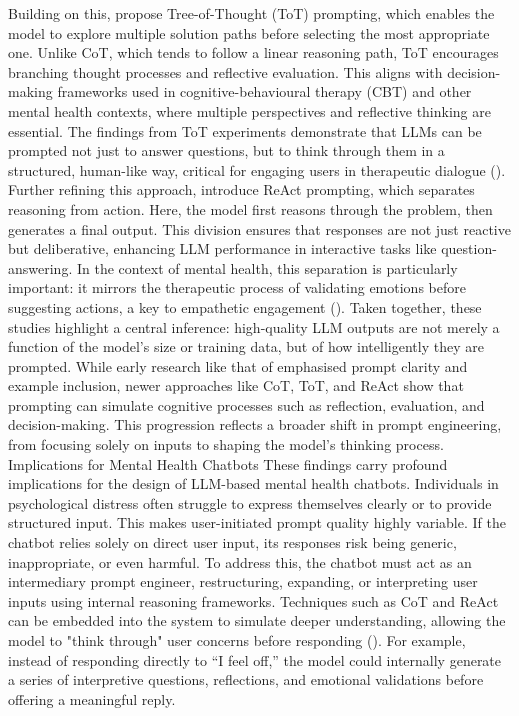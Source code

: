 Building on this, \cite{yao2023tree} propose Tree-of-Thought (ToT) prompting, which enables the model to explore multiple solution paths before selecting the most appropriate one. Unlike CoT, which tends to follow a linear reasoning path, ToT encourages branching thought processes and reflective evaluation. This aligns with decision-making frameworks used in cognitive-behavioural therapy (CBT) and other mental health contexts, where multiple perspectives and reflective thinking are essential. The findings from ToT experiments demonstrate that LLMs can be prompted not just to answer questions, but to think through them in a structured, human-like way, critical for engaging users in therapeutic dialogue (\cite{yao2023tree}).
Further refining this approach, \cite{yao2022react} introduce ReAct prompting, which separates reasoning from action. Here, the model first reasons through the problem, then generates a final output. This division ensures that responses are not just reactive but deliberative, enhancing LLM performance in interactive tasks like question-answering. In the context of mental health, this separation is particularly important: it mirrors the therapeutic process of validating emotions before suggesting actions, a key to empathetic engagement (\cite{yao2022react}).
Taken together, these studies highlight a central inference: high-quality LLM outputs are not merely a function of the model’s size or training data, but of how intelligently they are prompted. While early research like that of \cite{garg2021transformers, brown2020language} emphasised prompt clarity and example inclusion, newer approaches like CoT, ToT, and ReAct show that prompting can simulate cognitive processes such as reflection, evaluation, and decision-making. This progression reflects a broader shift in prompt engineering, from focusing solely on inputs to shaping the model’s thinking process.
Implications for Mental Health Chatbots
These findings carry profound implications for the design of LLM-based mental health chatbots. Individuals in psychological distress often struggle to express themselves clearly or to provide structured input. This makes user-initiated prompt quality highly variable. If the chatbot relies solely on direct user input, its responses risk being generic, inappropriate, or even harmful.
To address this, the chatbot must act as an intermediary prompt engineer, restructuring, expanding, or interpreting user inputs using internal reasoning frameworks. Techniques such as CoT and ReAct can be embedded into the system to simulate deeper understanding, allowing the model to "think through" user concerns before responding (\cite{wang2022self, yao2022react}). For example, instead of responding directly to “I feel off,” the model could internally generate a series of interpretive questions, reflections, and emotional validations before offering a meaningful reply.

